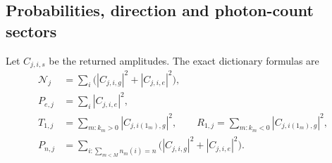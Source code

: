 \documentclass[11pt,a4paper]{article}
\begin{document}
\subsection{Probabilities, direction and photon-count sectors}

Let $C_{j,i,s}$ be the returned amplitudes. The exact dictionary formulas are
\begin{align}
\mathcal N_j&=\sum_i\bigl(|C_{j,i,g}|^2+|C_{j,i,e}|^2\bigr),\\
P_{e,j}&=\sum_i|C_{j,i,e}|^2,\\
T_{1,j}&=\sum_{m:k_m>0}|C_{j,i(1_m),g}|^2,\qquad
R_{1,j}=\sum_{m:k_m<0}|C_{j,i(1_m),g}|^2,\\
P_{n,j}&=\sum_{i:\sum_{m<M}n_m(i)=n}
  \bigl(|C_{j,i,g}|^2+|C_{j,i,e}|^2\bigr).
\label{eq:obs}
\end{align}
\end{document}
